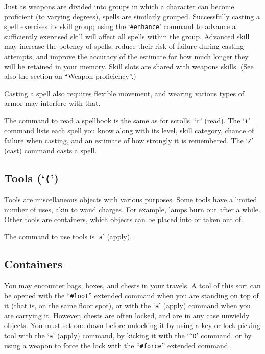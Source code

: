Just as weapons are divided into groups in which a character can become
proficient (to varying degrees), spells are similarly grouped.
Successfully casting a spell exercises its skill group; using the
`{\tt \#enhance}' command to advance a sufficiently exercised skill
will affect all spells within the group.  Advanced skill may increase the
potency of spells, reduce their risk of failure during casting attempts,
and improve the accuracy of the estimate for how much longer they will
be retained in your memory.
Skill slots are shared with weapons skills.  (See also the section on
``Weapon proficiency''.)

Casting a spell also requires flexible movement, and wearing various types
of armor may interfere with that.

The command to read a spellbook is the same as for scrolls, `{\tt r}' (read).
The `{\tt +}' command lists each spell you know along with its level, skill
category, chance of failure when casting, and an estimate of how strongly
it is remembered.
The `{\tt Z}' (cast) command casts a spell.

\subsection*{Tools (`{\tt (}')}

Tools are miscellaneous objects with various purposes.  Some tools
have a limited number of uses, akin to wand charges.  For example, lamps burn
out after a while.  Other tools are containers, which objects can
be placed into or taken out of.

The command to use tools is `{\tt a}' (apply).

\subsection*{Containers}

You may encounter bags, boxes, and chests in your travels.  A tool of
this sort can be opened with the ``{\tt \#loot}'' extended command when
you are standing on top of it (that is, on the same floor spot),
or with the `{\tt a}' (apply) command when you are carrying it.  However,
chests are often locked, and are in any case unwieldy objects.
You must set one down before unlocking it by
using a key or lock-picking tool with the `{\tt a}' (apply) command,
by kicking it with the `{\tt \^{}D}' command,
or by using a weapon to force the lock with the ``{\tt \#force}''
extended command.

